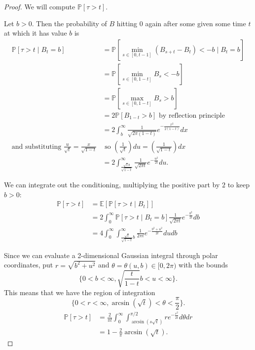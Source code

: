\documentclass{tufte-handout}
\newcommand*\E{\mathbb{E}}
\renewcommand*\P{\mathbb{P}}
\theoremstyle{definition}
\begin{document}
\begin{proof}
	We will compute $\P\left[\tau > t\right] $.

	Let $b > 0$. Then the probability of $B$ hitting $0$ again after some given some time $t$ at which it has value $b$ is
	\begin{align*}
		\P\left[\tau > t \mid B_t = b\right] &= \P\left[\min_{s \in [0, t-1]} \left( B_{s+t} - B_t \right) < -b \mid B_t = b\right]  \\
											 &= \P\left[\min_{s \in [0,1-t]} B_s < -b\right] \\
											 &= \P\left[\max_{s \in [0,1-t]} B_s > b\right] \\
											 &= 2\P\left[B_{1-t} > b\right] \text{ by reflection principle} \\
											 &= 2 \int_{b}^{\infty} \frac{1}{\sqrt{2\pi (1-t)} } e^{- \frac{x^2}{2(1-t)}}dx \\
	\text{and substituting $\frac{u}{\sqrt{t} } = \frac{x}{\sqrt{1-t} }$} & \text{ so $\left( \frac{1}{\sqrt{t} } \right)du = \left( \frac{1}{\sqrt{1-t} } \right)dx$} \\
																			 &= 2 \int_{\frac{\sqrt{t} b}{\sqrt{1-t} }}^{\infty} \frac{1}{\sqrt{2\pi t}} e^{- \frac{u^2}{2t}} du 
	.\end{align*}

	We can integrate out the conditioning, multiplying the positive part by $2$ to keep $ b>0$:
	\begin{align*}
		\P\left[\tau > t\right] &= \E\left[\P\left[\tau > t \mid B_t\right] \right]  \\
		&= 2 \int_{0}^{\infty} \P\left[\tau > t \mid B_t = b\right] \frac{1}{\sqrt{2\pi t} }e^{-\frac{b^2}{2t}}db  \\
		&= 4 \int_{0}^{\infty} \int_{\frac{\sqrt{t}}{\sqrt{1-t} }b}^{\infty} \frac{1}{2\pi t} e^{- \frac{b^2+ u^2}{2t}}du db
	\end{align*}

	Since we can evaluate a 2-dimensional Gaussian integral through polar coordinates, put $r = \sqrt{b^2+u^2} $ and $\theta = \theta(u,b) \in [0,2\pi)$ with the bounds \[
		\{0 < b< \infty, \sqrt{\frac{t}{1-t}} b < u <\infty\}
	.\] This means that we have the region of integration \[
		\{0 < r< \infty,\arcsin{(\sqrt{t}) } < \theta < \frac{\pi}{2}\}
	.\] 
	\begin{align*}
		\P\left[\tau > t\right] &= \frac{2}{\pi t} \int_{0}^{\infty} \int_{\arcsin{(s\sqrt{t} )}}^{\pi/2} re^{- \frac{r^2}{2t}}d\theta dr  \\
								&= 1-\frac{2}{\pi} \arcsin{\left( \sqrt{t}  \right)}
	.\end{align*}
\end{proof}
\end{document}
